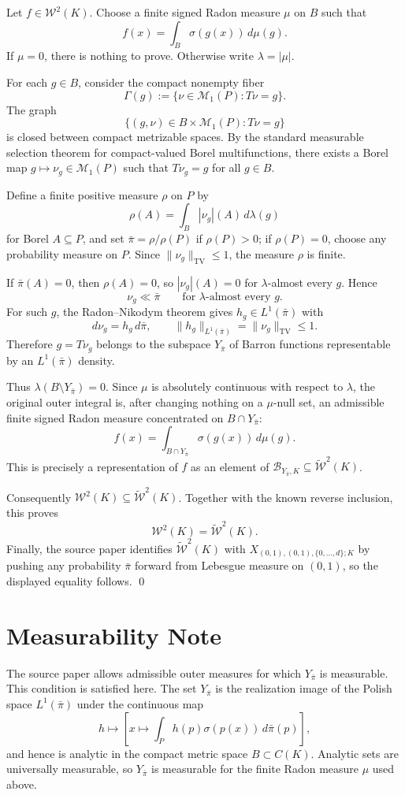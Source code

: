 \documentclass[11pt]{article}
\newcommand{\M}{\mathcal M}
\newcommand{\B}{\mathcal B}
\newcommand{\W}{\mathcal W}
\newcommand{\tW}{\widetilde{\mathcal W}}
\newcommand{\1}{\mathbf 1}
\newcommand{\TV}{\operatorname{TV}}
\begin{document}
Let $f\in \W^2(K)$. Choose a finite signed Radon measure $\mu$ on $B$ such that
\[
  f(x)=\int_B \sigma(g(x))\,d\mu(g).
\]
If $\mu=0$, there is nothing to prove. Otherwise write $\lambda=|\mu|$.

For each $g\in B$, consider the compact nonempty fiber
\[
  \Gamma(g):=\{\nu\in \M_1(P):T\nu=g\}.
\]
The graph
\[
  \{(g,\nu)\in B\times \M_1(P):T\nu=g\}
\]
is closed between compact metrizable spaces. By the standard measurable selection theorem for compact-valued Borel multifunctions, there exists a Borel map $g\mapsto \nu_g\in \M_1(P)$ such that $T\nu_g=g$ for all $g\in B$.

Define a finite positive measure $\rho$ on $P$ by
\[
  \rho(A)=\int_B |\nu_g|(A)\,d\lambda(g)
\]
for Borel $A\subseteq P$, and set $\bar\pi=\rho/\rho(P)$ if $\rho(P)>0$; if $\rho(P)=0$, choose any probability measure on $P$. Since $\|\nu_g\|_{\TV}\le 1$, the measure $\rho$ is finite.

If $\bar\pi(A)=0$, then $\rho(A)=0$, so $|\nu_g|(A)=0$ for $\lambda$-almost every $g$. Hence
\[
  \nu_g\ll \bar\pi \qquad\text{for }\lambda\text{-almost every }g.
\]
For such $g$, the Radon--Nikodym theorem gives $h_g\in L^1(\bar\pi)$ with
\[
  d\nu_g=h_g\,d\bar\pi, \qquad
  \|h_g\|_{L^1(\bar\pi)}=\|\nu_g\|_{\TV}\le 1.
\]
Therefore $g=T\nu_g$ belongs to the subspace $Y_{\bar\pi}$ of Barron functions representable by an $L^1(\bar\pi)$ density.

Thus $\lambda(B\setminus Y_{\bar\pi})=0$. Since $\mu$ is absolutely continuous with respect to $\lambda$, the original outer integral is, after changing nothing on a $\mu$-null set, an admissible finite signed Radon measure concentrated on $B\cap Y_{\bar\pi}$:
\[
  f(x)=\int_{B\cap Y_{\bar\pi}} \sigma(g(x))\,d\mu(g).
\]
This is precisely a representation of $f$ as an element of $\B_{Y_{\bar\pi},K}\subseteq \tW^2(K)$.

Consequently $\W^2(K)\subseteq \tW^2(K)$. Together with the known reverse inclusion, this proves
\[
  \W^2(K)=\tW^2(K).
\]
Finally, the source paper identifies $\tW^2(K)$ with $X_{(0,1),(0,1),\{0,\dots,d\};K}$ by pushing any probability $\bar\pi$ forward from Lebesgue measure on $(0,1)$, so the displayed equality follows.
\qed

\section*{Measurability Note}

The source paper allows admissible outer measures for which $Y_{\bar\pi}$ is measurable. This condition is satisfied here. The set $Y_{\bar\pi}$ is the realization image of the Polish space $L^1(\bar\pi)$ under the continuous map
\[
  h\mapsto \left[x\mapsto \int_P h(p)\sigma(p(x))\,d\bar\pi(p)\right],
\]
and hence is analytic in the compact metric space $B\subset C(K)$. Analytic sets are universally measurable, so $Y_{\bar\pi}$ is measurable for the finite Radon measure $\mu$ used above.
\end{document}
